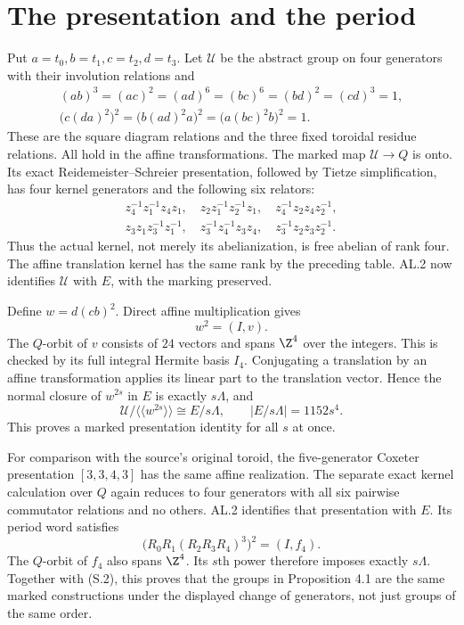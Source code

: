 \section{The presentation and the period}
Put $a=t_0,b=t_1,c=t_2,d=t_3$. Let $\mathcal U$ be the abstract group
on four generators with their involution relations and
\begin{gather*}
 (ab)^3=(ac)^2=(ad)^6=(bc)^6=(bd)^2=(cd)^3=1,\\
 \bigl(c(da)^2\bigr)^2=
 \bigl(b(ad)^2a\bigr)^2=
 \bigl(a(bc)^2b\bigr)^2=1.                           \tag{S.6}
\end{gather*}
These are the square diagram relations and the three fixed toroidal
residue relations. All hold in the affine transformations. The marked
map $\mathcal U\to Q$ is onto. Its exact Reidemeister--Schreier
presentation, followed by Tietze simplification, has four kernel
generators and the following six relators:
\[
\begin{gathered}
 z_4^{-1}z_1^{-1}z_4z_1,\quad z_2z_1^{-1}z_2^{-1}z_1,
 \quad z_4^{-1}z_2z_4z_2^{-1},\\
 z_3z_1z_3^{-1}z_1^{-1},\quad z_3^{-1}z_4^{-1}z_3z_4,
 \quad z_3^{-1}z_2z_3z_2^{-1}.
\end{gathered}                                      \tag{S.7}
\]
Thus the actual kernel, not merely its abelianization, is free abelian
of rank four. The affine translation kernel has the same rank by the
preceding table. AL.2 now identifies $\mathcal U$ with $E$, with the
marking preserved.

Define $w=d(cb)^2$. Direct affine multiplication gives
\[
 w^2=(I,v).                                         \tag{S.8}
\]
The $Q$-orbit of $v$ consists of $24$ vectors and spans $\Z^4$ over
the integers. This is checked by its full integral Hermite basis $I_4$.
Conjugating a translation by an affine transformation applies its
linear part to the translation vector. Hence the normal closure of
$w^{2s}$ in $E$ is exactly $s\Lambda$, and
\[
 \mathcal U/\langle\!\langle w^{2s}\rangle\!\rangle
       \cong E/s\Lambda,
 \qquad |E/s\Lambda|=1152s^4.                       \tag{S.9}
\]
This proves a marked presentation identity for all $s$ at once.

For comparison with the source's original toroid, the five-generator
Coxeter presentation $[3,3,4,3]$ has the same affine realization.
The separate exact kernel calculation over $Q$ again reduces to four
generators with all six pairwise commutator relations and no others.
AL.2 identifies that presentation with $E$. Its period word satisfies
\[
 \bigl(R_0R_1(R_2R_3R_4)^3\bigr)^2=(I,f_4).
\]
The $Q$-orbit of $f_4$ also spans $\Z^4$. Its $s$th power therefore
imposes exactly $s\Lambda$. Together with (S.2), this proves that the
groups in Proposition 4.1 are the same marked constructions under
the displayed change of generators, not just groups of the same order.

